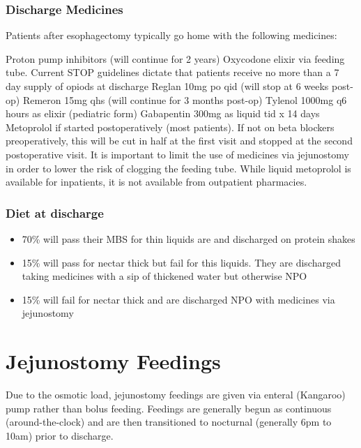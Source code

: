 \documentclass[
]{book}
\providecommand{\tightlist}{%
  \setlength{\itemsep}{0pt}\setlength{\parskip}{0pt}}
\begin{document}
\hypertarget{discharge-medicines}{%
\subsection{Discharge Medicines}\label{discharge-medicines}}

Patients after esophagectomy typically go home with the following medicines:

Proton pump inhibitors (will continue for 2 years)
Oxycodone elixir via feeding tube. Current STOP guidelines dictate that patients receive no more than a 7 day supply of opiods at discharge
Reglan 10mg po qid (will stop at 6 weeks post-op)
Remeron 15mg qhs (will continue for 3 months post-op)
Tylenol 1000mg q6 hours as elixir (pediatric form)
Gabapentin 300mg as liquid tid x 14 days
Metoprolol if started postoperatively (most patients). If not on beta blockers preoperatively, this will be cut in half at the first visit and stopped at the second postoperative visit. It is important to limit the use of medicines via jejunostomy in order to lower the risk of clogging the feeding tube. While liquid metoprolol is available for inpatients, it is not available from outpatient pharmacies.

\hypertarget{diet-at-discharge}{%
\subsection{Diet at discharge}\label{diet-at-discharge}}

\begin{itemize}
\tightlist
\item
  70\% will pass their MBS for thin liquids are and discharged on protein shakes
\item
  15\% will pass for nectar thick but fail for this liquids. They are discharged taking medicines with a sip of thickened water but otherwise NPO
\item
  15\% will fail for nectar thick and are discharged NPO with medicines via jejunostomy
\end{itemize}

\hypertarget{jejunostomy-feedings}{%
\chapter{Jejunostomy Feedings}\label{jejunostomy-feedings}}

Due to the osmotic load, jejunostomy feedings are given via enteral (Kangaroo) pump rather than bolus feeding. Feedings are generally begun as continuous (around-the-clock) and are then transitioned to nocturnal (generally 6pm to 10am) prior to discharge.
\end{document}
